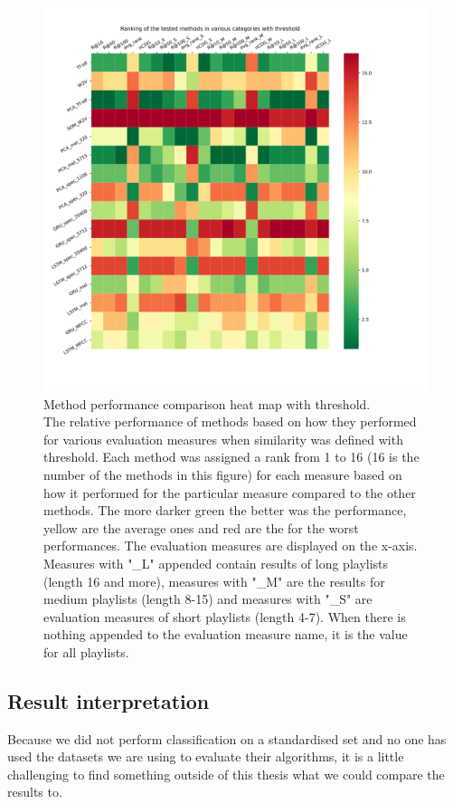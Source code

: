 \begin{figure}[h]
    \centering
	\includegraphics[width=1\linewidth]{./img/threshold_method_ranking.png}
	\caption[Method performance comparison heat map with threshold applied]{Method performance comparison heat map with threshold. \\ The relative performance of methods based on how they performed for various evaluation measures when similarity was defined with threshold. Each method was assigned a rank from 1 to 16 (16 is the number of the methods in this figure) for each measure based on how it performed for the particular measure compared to the other methods. The more darker green the better was the performance, yellow are the average ones and red are the for the worst performances. The evaluation measures are displayed on the x-axis. Measures with "\_L" appended contain results of long playlists (length 16 and more), measures with "\_M" are the results for medium playlists (length 8-15) and measures with "\_S" are evaluation measures of short playlists (length 4-7). When there is nothing appended to the evaluation measure name, it is the value for all playlists.}
	\label{fig:threshold_method_comparison}
\end{figure}

\subsection{Result interpretation}\label{ssec:absolute_results}
Because we did not perform classification on a standardised set and no one has used the datasets we are using to evaluate their algorithms, it is a little challenging to find something outside of this thesis what we could compare the results to.

